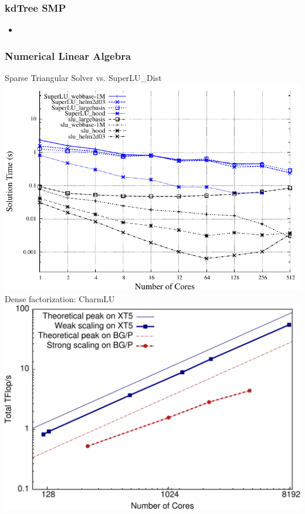 \begin{frame}
\frametitle{kdTree SMP}
\begin{itemize}
\item
\end{itemize}
%
\end{frame}

\begin{frame}
\frametitle{Numerical Linear Algebra}
%
Sparse Triangular Solver vs. SuperLU\_Dist
\includegraphics[scale=0.45]{../figures/sparselu_superlu_comparison.pdf}\\
Dense factorization: CharmLU
\includegraphics[scale=0.2]{../figures/charmlu_scaling.pdf}
\end{frame}

